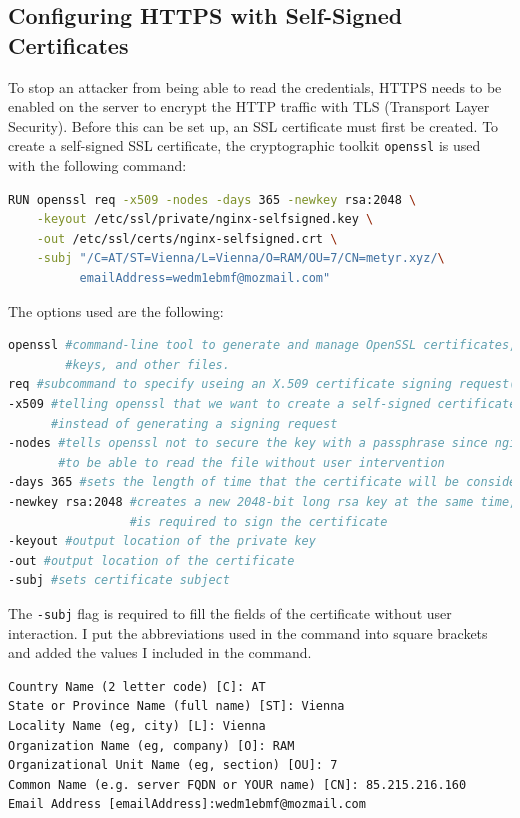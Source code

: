 \documentclass[a4paper]{article}
\begin{document}
\subsection{Configuring HTTPS with Self-Signed Certificates}
To stop an attacker from being able to read the credentials, HTTPS needs to be enabled on the server to encrypt the HTTP traffic with TLS (Transport Layer Security). Before this can be set up, an SSL certificate must first be created.
To create a self-signed SSL certificate, the cryptographic toolkit \texttt{openssl} is used with the following command:\cite{self-signed-ssl,non-interactive-ssl-gen}
\begin{lstlisting}[language=bash]
RUN openssl req -x509 -nodes -days 365 -newkey rsa:2048 \
    -keyout /etc/ssl/private/nginx-selfsigned.key \
    -out /etc/ssl/certs/nginx-selfsigned.crt \
    -subj "/C=AT/ST=Vienna/L=Vienna/O=RAM/OU=7/CN=metyr.xyz/\
          emailAddress=wedm1ebmf@mozmail.com"
\end{lstlisting}
The options used are the following:
\begin{lstlisting}[language=bash]
openssl #command-line tool to generate and manage OpenSSL certificates,
        #keys, and other files.
req #subcommand to specify useing an X.509 certificate signing request(CSR)
-x509 #telling openssl that we want to create a self-signed certificate
      #instead of generating a signing request
-nodes #tells openssl not to secure the key with a passphrase since nginx needs
       #to be able to read the file without user intervention
-days 365 #sets the length of time that the certificate will be considered valid
-newkey rsa:2048 #creates a new 2048-bit long rsa key at the same time, which 
                 #is required to sign the certificate
-keyout #output location of the private key
-out #output location of the certificate
-subj #sets certificate subject
\end{lstlisting}
The \texttt{-subj} flag is required to fill the fields of the certificate without user interaction. I put the abbreviations used in the command into square brackets and added the values I included in the command.
\begin{lstlisting}
Country Name (2 letter code) [C]: AT
State or Province Name (full name) [ST]: Vienna
Locality Name (eg, city) [L]: Vienna
Organization Name (eg, company) [O]: RAM
Organizational Unit Name (eg, section) [OU]: 7
Common Name (e.g. server FQDN or YOUR name) [CN]: 85.215.216.160
Email Address [emailAddress]:wedm1ebmf@mozmail.com
\end{lstlisting}
\end{document}
